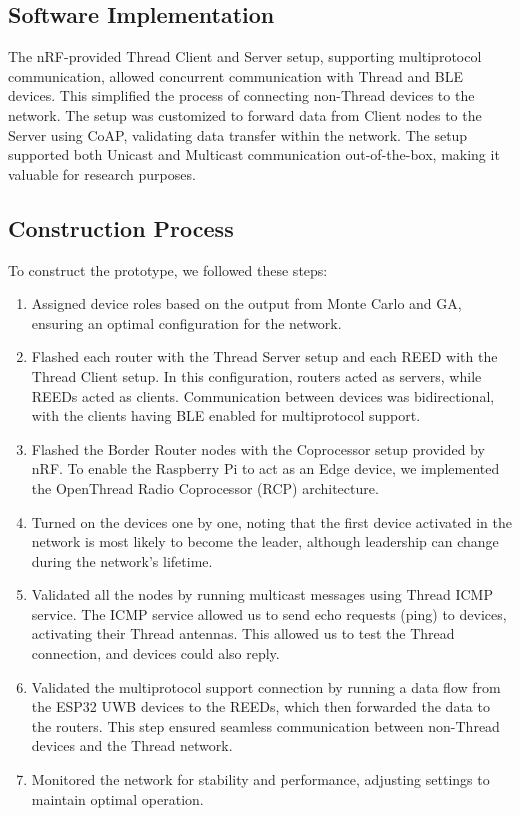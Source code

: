 \subsection{Software Implementation}\label{sec:software_implementation}
The nRF-provided Thread Client and Server setup, supporting multiprotocol communication, allowed concurrent communication with Thread and BLE devices. This simplified the process of connecting non-Thread devices to the network. The setup was customized to forward data from Client nodes to the Server using CoAP, validating data transfer within the network. The setup supported both Unicast and Multicast communication out-of-the-box, making it valuable for research purposes.

\subsection{Construction Process}\label{sec:construction_process}
To construct the prototype, we followed these steps:

\vspace{2mm}
\begin{enumerate}
    \item Assigned device roles based on the output from Monte Carlo and GA, ensuring an optimal configuration for the network.
    \item Flashed each router with the Thread Server setup and each REED with the Thread Client setup. In this configuration, routers acted as servers, while REEDs acted as clients. Communication between devices was bidirectional, with the clients having BLE enabled for multiprotocol support.
    \item Flashed the Border Router nodes with the Coprocessor setup provided by nRF. To enable the Raspberry Pi to act as an Edge device, we implemented the OpenThread Radio Coprocessor (RCP) architecture.
    \item Turned on the devices one by one, noting that the first device activated in the network is most likely to become the leader, although leadership can change during the network's lifetime.
    \item Validated all the nodes by running multicast messages using Thread ICMP service. The ICMP service allowed us to send echo requests (ping) to devices, activating their Thread antennas. This allowed us to test the Thread connection, and devices could also reply.
    \item Validated the multiprotocol support connection by running a data flow from the ESP32 UWB devices to the REEDs, which then forwarded the data to the routers. This step ensured seamless communication between non-Thread devices and the Thread network.
    \item Monitored the network for stability and performance, adjusting settings to maintain optimal operation.
\end{enumerate}
\vspace{3mm}

